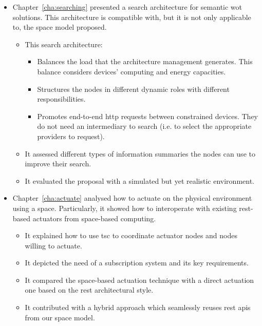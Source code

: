 \begin{itemize}
  \item Chapter~\ref{cha:searching} presented a search architecture for semantic \ac{wot} solutions.
        This architecture is compatible with, but it is not only applicable to, the space model proposed.
    \begin{itemize}
      \item This search architecture:
      \begin{itemize}
	\item Balances the load that the architecture management generates.
	      This balance considers devices' computing and energy capacities.
	\item Structures the nodes in different dynamic roles with different responsibilities. %
	\item Promotes end-to-end \ac{http} requests between constrained devices.
	      They do not need an intermediary to search (i.e. to select the appropriate providers to request). %
      \end{itemize}
      \item It assessed different types of information summaries the nodes can use to improve their search.
      \item It evaluated the proposal with a simulated but yet realistic environment.
    \end{itemize}
    
  \item Chapter~\ref{cha:actuate} analysed how to actuate on the physical environment using a space. %
	Particularly, it showed how to interoperate with existing \ac{rest}-based actuators from space-based computing.
    \begin{itemize}
      \item It explained how to use \ac{tsc} to coordinate actuator nodes and nodes willing to actuate.
      \item It depicted the need of a subscription system and its key requirements.
      \item It compared the space-based actuation technique with a direct actuation one based on the \ac{rest} architectural style. %
      \item It contributed with a hybrid approach which seamlessly reuses \ac{rest} \acp{api} from our space model.
    \end{itemize}
  

\end{itemize}
